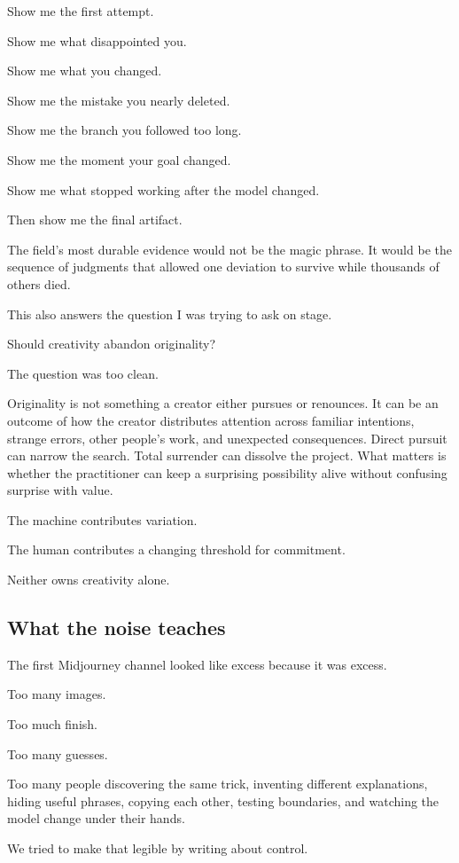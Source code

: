 \documentclass[
]{article}
\begin{document}
Show me the first attempt.

Show me what disappointed you.

Show me what you changed.

Show me the mistake you nearly deleted.

Show me the branch you followed too long.

Show me the moment your goal changed.

Show me what stopped working after the model changed.

Then show me the final artifact.

The field's most durable evidence would not be the magic phrase. It
would be the sequence of judgments that allowed one deviation to survive
while thousands of others died.

This also answers the question I was trying to ask on stage.

Should creativity abandon originality?

The question was too clean.

Originality is not something a creator either pursues or renounces. It
can be an outcome of how the creator distributes attention across
familiar intentions, strange errors, other people's work, and unexpected
consequences. Direct pursuit can narrow the search. Total surrender can
dissolve the project. What matters is whether the practitioner can keep
a surprising possibility alive without confusing surprise with value.

The machine contributes variation.

The human contributes a changing threshold for commitment.

Neither owns creativity alone.

\subsection{What the noise teaches}\label{what-the-noise-teaches}

The first Midjourney channel looked like excess because it was excess.

Too many images.

Too much finish.

Too many guesses.

Too many people discovering the same trick, inventing different
explanations, hiding useful phrases, copying each other, testing
boundaries, and watching the model change under their hands.

We tried to make that legible by writing about control.
\end{document}
